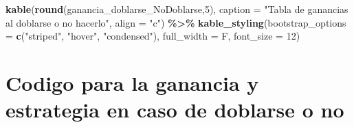 \documentclass[12pt,a4paper,]{book}
\newenvironment{Shaded}{\begin{snugshade}}{\end{snugshade}}
\newcommand{\AttributeTok}[1]{\textcolor[rgb]{0.13,0.29,0.53}{#1}}
\newcommand{\DecValTok}[1]{\textcolor[rgb]{0.00,0.00,0.81}{#1}}
\newcommand{\FunctionTok}[1]{\textcolor[rgb]{0.13,0.29,0.53}{\textbf{#1}}}
\newcommand{\NormalTok}[1]{#1}
\newcommand{\SpecialCharTok}[1]{\textcolor[rgb]{0.81,0.36,0.00}{\textbf{#1}}}
\newcommand{\StringTok}[1]{\textcolor[rgb]{0.31,0.60,0.02}{#1}}
\numberwithin{dummy}{section}
\theoremstyle{ocrenumbox}
\theoremstyle{blacknumex}
\theoremstyle{blacknumbox}
\theoremstyle{ocrenum}
\theoremstyle{ocrenum}
\begin{document}
\begin{Shaded}
\begin{Highlighting}[]
\FunctionTok{kable}\NormalTok{(}\FunctionTok{round}\NormalTok{(ganancia\_doblarse\_NoDoblarse,}\DecValTok{5}\NormalTok{), }
      \AttributeTok{caption =} \StringTok{"Tabla de ganancias al doblarse o no hacerlo"}\NormalTok{,}
      \AttributeTok{align =} \StringTok{"c"}\NormalTok{) }\SpecialCharTok{\%\textgreater{}\%}
  \FunctionTok{kable\_styling}\NormalTok{(}\AttributeTok{bootstrap\_options =} \FunctionTok{c}\NormalTok{(}\StringTok{"striped"}\NormalTok{, }\StringTok{"hover"}\NormalTok{, }\StringTok{"condensed"}\NormalTok{),}
                \AttributeTok{full\_width =}\NormalTok{ F, }\AttributeTok{font\_size =} \DecValTok{12}\NormalTok{)}
\end{Highlighting}
\end{Shaded}

\hypertarget{codigo-para-la-ganancia-y-estrategia-en-caso-de-doblarse-o-no-1}{%
\section{Codigo para la ganancia y estrategia en caso de doblarse o
no}\label{codigo-para-la-ganancia-y-estrategia-en-caso-de-doblarse-o-no-1}}
\end{document}
